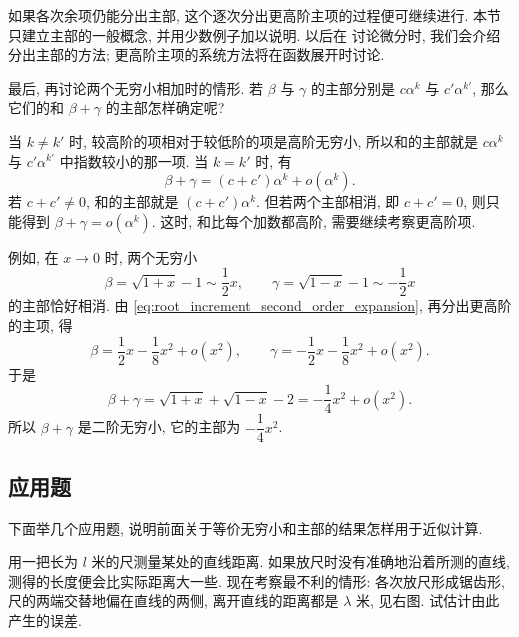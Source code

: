如果各次余项仍能分出主部, 这个逐次分出更高阶主项的过程便可继续进行.
本节只建立主部的一般概念, 并用少数例子加以说明.
以后在  讨论微分时, 我们会介绍分出主部的方法; 更高阶主项的系统方法将在函数展开时讨论.

最后, 再讨论两个无穷小相加时的情形.
若 $\beta$ 与 $\gamma$ 的主部分别是 $c\alpha^k$ 与 $c'\alpha^{k'}$,
那么它们的和 $\beta+\gamma$ 的主部怎样确定呢?

当 $k\neq k'$ 时, 较高阶的项相对于较低阶的项是高阶无穷小,
所以和的主部就是 $c\alpha^k$ 与 $c'\alpha^{k'}$ 中指数较小的那一项.
当 $k=k'$ 时, 有
$$
\beta+\gamma=(c+c')\alpha^k+o(\alpha^k).
$$
{\kaishu 若 $c+c'\neq0$, 和的主部就是 $(c+c')\alpha^k$.}
但若两个主部相消, 即 $c+c'=0$, 则只能得到
$\beta+\gamma=o(\alpha^k)$.
这时, 和比每个加数都高阶, 需要继续考察更高阶项.

例如, 在 $x\to0$ 时, 两个无穷小
$$
\beta=\sqrt{1+x}-1\sim\frac12x,\qquad
\gamma=\sqrt{1-x}-1\sim-\frac12x
$$
的主部恰好相消.
由 \eqref{eq:root_increment_second_order_expansion}, 再分出更高阶的主项, 得
$$
\beta=\frac12x-\frac18x^2+o(x^2),\qquad
\gamma=-\frac12x-\frac18x^2+o(x^2).
$$
于是
\begin{equation}\label{eq:principal_part_cancellation_example}
\beta+\gamma=\sqrt{1+x}+\sqrt{1-x}-2
=-\frac14x^2+o(x^2).
\end{equation}
所以 $\beta+\gamma$ 是二阶无穷小, 它的主部为 $-\dfrac14x^2$.

\raggedbottom
\subsection{应用题}\label{subsec:64}
下面举几个应用题, 说明前面关于等价无穷小和主部的结果怎样用于近似计算.

\begin{figure}
    \centering
\end{figure}
\label{ex:measuring_ruler_alignment_error}
用一把长为 $l$ 米的尺测量某处的直线距离.
如果放尺时没有准确地沿着所测的直线,
测得的长度便会比实际距离大一些.
现在考察最不利的情形: 各次放尺形成锯齿形,
尺的两端交替地偏在直线的两侧,
离开直线的距离都是 $\lambda$ 米, 见右图.
试估计由此产生的误差.

